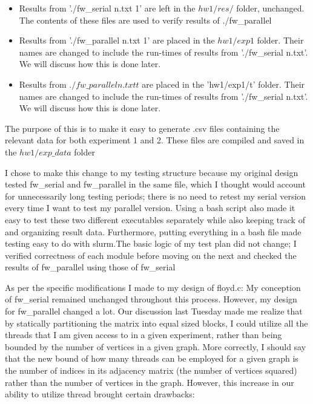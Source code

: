 \documentclass[]{article}
\begin{document}
\begin{itemize}
\begin{itemize}
			\item Results from './fw\_serial n.txt 1' are left in the $hw1/res/$ folder, unchanged. The contents of these files are used to verify results of ./fw\_parallel
			\item Results from './fw\_parallel n.txt 1' are placed in the $hw1/exp1$ folder. Their names are changed to include the run-times of results from './fw\_serial n.txt'. We will discuss how this is done later.
			\item Results from $./fw\_parallel n.txt t$ are placed in the 'hw1/exp1/t' folder. Their names are changed to include the run-times of results from './fw\_serial n.txt'.  We will discuss how this is done later.
		\end{itemize}
		The purpose of this is to make it easy to generate .csv files containing the relevant data for both experiment 1 and 2. These files are compiled and saved in the $hw1/exp\_data$ folder

		I chose to make this change to my testing structure because my original design tested fw\_serial and fw\_parallel in the same file, which I thought would account for unnecessarily long testing periods; there is no need to retest my serial version every time I want to test my parallel version. Using a bash script also made it easy to test these two different executables separately while also keeping track of and organizing result data. Furthermore, putting everything in a bash file made testing easy to do with slurm.The basic logic of my test plan did not change; I verified correctness of each module before moving on the next and checked the results of fw\_parallel using those of fw\_serial
	\end{itemize}
	As per the specific modifications I made to my design of floyd.c: My conception of fw\_serial remained unchanged throughout this process. However, my design for fw\_parallel changed a lot. Our discussion last Tuesday made me realize that by statically partitioning the matrix into equal sized blocks, I could utilize all the threads that I am given access to in a given experiment, rather than being bounded by the number of vertices in a given graph. More correctly, I should say that the new bound of how many threads can be employed for a given graph is the number of indices in its adjacency matrix (the number of vertices squared) rather than the number of vertices in the graph. However, this increase in our ability to utilize thread brought certain drawbacks: 
\end{document}

